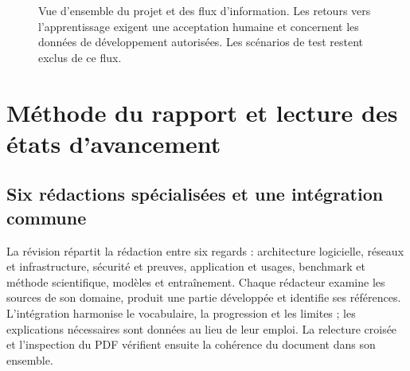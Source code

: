 \documentclass[11pt,a4paper]{article}
\begin{document}
\begin{figure}[H]
\centering
{}
\caption{Vue d'ensemble du projet et des flux d'information. Les retours
vers l'apprentissage exigent une acceptation humaine et concernent les données
de développement autorisées. Les scénarios de test restent exclus de ce flux.}
\label{fig:intro-ensemble}
\end{figure}

\section{Méthode du rapport et lecture des états d'avancement}
\label{sec:methode-bilan}
\subsection{Six rédactions spécialisées et une intégration commune}
La révision répartit la rédaction entre six regards : architecture logicielle,
réseaux et infrastructure, sécurité et preuves, application et usages,
benchmark et méthode scientifique, modèles et entraînement. Chaque rédacteur
examine les sources de son domaine, produit une partie développée et identifie
ses références. L'intégration harmonise le vocabulaire, la progression et les
limites ; les explications nécessaires sont données au lieu de leur emploi. La relecture croisée et l'inspection du PDF vérifient ensuite la
cohérence du document dans son ensemble.
\end{document}
